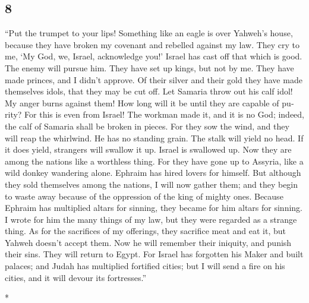 \begin{paracol}{2}
\switchcolumn
\begin{otherlanguage}{english}

\hypertarget{section-15}{%
\section{8}\label{section-15}}

 ``Put the trumpet to your lips! Something like an eagle
is over Yahweh's house, because they have broken my covenant and
rebelled against my law.  They cry to me, `My God, we,
Israel, acknowledge you!'  Israel has cast off that which
is good. The enemy will pursue him.  They have set up
kings, but not by me. They have made princes, and I didn't approve. Of
their silver and their gold they have made themselves idols, that they
may be cut off.  Let Samaria throw out his calf idol! My
anger burns against them! How long will it be until they are capable of
purity?  For this is even from Israel! The workman made
it, and it is no God; indeed, the calf of Samaria shall be broken in
pieces.  For they sow the wind, and they will reap the
whirlwind. He has no standing grain. The stalk will yield no head. If it
does yield, strangers will swallow it up.  Israel is
swallowed up. Now they are among the nations like a worthless thing.
 For they have gone up to Assyria, like a wild donkey
wandering alone. Ephraim has hired lovers for himself. 
But although they sold themselves among the nations, I will now gather
them; and they begin to waste away because of the oppression of the king
of mighty ones.  Because Ephraim has multiplied altars
for sinning, they became for him altars for sinning.  I
wrote for him the many things of my law, but they were regarded as a
strange thing.  As for the sacrifices of my offerings,
they sacrifice meat and eat it, but Yahweh doesn't accept them. Now he
will remember their iniquity, and punish their sins. They will return to
Egypt.  For Israel has forgotten his Maker and built
palaces; and Judah has multiplied fortified cities; but I will send a
fire on his cities, and it will devour its fortresses.''

\end{otherlanguage}

\switchcolumn[0]*

\hypertarget{anuncio-del-juicio-del-exilio-en-un-festival-de-otouxf1o}{%
}
\end{paracol}
